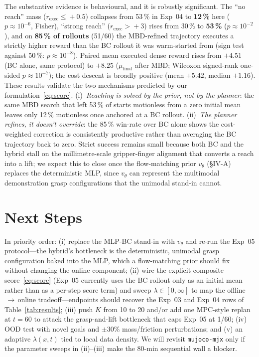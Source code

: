 \documentclass[letterpaper, 10 pt, conference]{ieeeconf}
\begin{document}
The substantive evidence is behavioural, and it is robustly
significant. The ``no reach'' mass
($r_{\mathrm{exec}}\!\le\!+0.5$) collapses from 53\,\% in Exp~04
to \textbf{12\,\%} here ($p\!\approx\!10^{-6}$, Fisher), ``strong
reach'' ($r_{\mathrm{exec}}\!>\!+3$) rises from 30\,\% to
\textbf{53\,\%} ($p\!\approx\!10^{-2}$), and on
\textbf{85\,\% of rollouts} (51/60) the MBD-refined trajectory
executes a strictly higher reward than the BC rollout it was
warm-started from (sign test against 50\,\%:
$p\!\approx\!10^{-8}$). Paired mean executed dense reward rises
from $+4.51$ (BC alone, same protocol) to $\mathbf{+8.25}$
($\mu_{\text{final}}$ after MBD; Wilcoxon signed-rank one-sided
$p\!\approx\!10^{-7}$); the cost descent is broadly positive
(mean $+5.42$, median $+1.16$). These results validate the two
mechanisms predicted by our formulation~\eqref{eq:score}.
(i)~\emph{Reaching is solved by the prior, not by the planner}:
the same MBD search that left 53\,\% of starts motionless from a
zero initial mean leaves only 12\,\% motionless once anchored at
a BC rollout. (ii)~\emph{The planner refines, it doesn't
override}: the 85\,\% win-rate over BC alone shows the
cost-weighted correction is consistently productive rather than
averaging the BC trajectory back to zero. Strict success remains
small because both BC and the hybrid stall on the
millimetre-scale gripper-finger alignment that converts a reach
into a lift; we expect this to close once the flow-matching prior
$v_\theta$ (\S IV-A) replaces the deterministic MLP, since
$v_\theta$ can represent the multimodal demonstration grasp
configurations that the unimodal stand-in cannot.

\section{Next Steps}

In priority order: (i) replace the MLP-BC stand-in with $v_\theta$
and re-run the Exp~05 protocol---the hybrid's bottleneck is the
deterministic, unimodal grasp configuration baked into the MLP,
which a flow-matching prior should fix without changing the
online component; (ii) wire the explicit composite
score~\eqref{eq:score} (Exp~05 currently uses the BC rollout
only as an initial mean rather than as a per-step score term)
and sweep $\lambda\in[0,\infty]$ to map the offline$\,\to\,$online
tradeoff---endpoints should recover the Exp~03 and Exp~04 rows of
Table~\ref{tab:results}; (iii) push $K$ from 10 to 20 and/or add
one MPC-style replan at $t\!=\!60$ to attack the grasp-and-lift
bottleneck that caps Exp~05 at 1/60; (iv) OOD test with novel
goals and $\pm30\%$ mass/friction perturbations; and (v) an
adaptive $\lambda(x,t)$ tied to local data density. We will
revisit \texttt{mujoco-mjx} only if the parameter sweeps in
(ii)--(iii) make the 80-min sequential wall a blocker.
\end{document}
